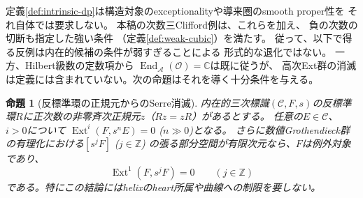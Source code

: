 \documentclass[11pt,a4paper]{ltjsarticle}
\newtheorem{proposition}[theorem]{命題}
\theoremstyle{definition}
\begin{document}
定義\ref{def:intrinsic-dp}は構造対象のexceptionalityや導来圏のsmooth proper性を
それ自体では要求しない。
本稿の次数三Clifford例は、これらを加え、
負の次数の切断も指定した強い条件
（定義\ref{def:weak-cubic}）を満たす。
従って、以下で得る反例は内在的候補の条件が弱すぎることによる
形式的な退化ではない。
一方、Hilbert級数の定数項から
$\operatorname{End}_{\mathcal A}(\mathcal O)=\mathbb C$は既に従うが、
高次Ext群の消滅は定義には含まれていない。次の命題はそれを導く十分条件を与える。

\begin{proposition}[反標準環の正規元からのSerre消滅]
\label{prop:intrinsic-central-serre-vanishing}
内在的三次標識$(\mathcal C,F,s)$の反標準環$R$に正次数の非零斉次正規元$z$（$Rz=zR$）があるとする。
任意の$E\in\mathcal C$、$i>0$について
$\operatorname{Ext}^i(F,s^n E)=0$ ($n\gg0$)となる。
さらに数値Grothendieck群の有理化における$[s^jF]$ ($j\in\mathbb Z$)
の張る部分空間が有限次元なら、$F$は例外対象であり、
\[
 \operatorname{Ext}^1(F,s^jF)=0\qquad(j\in\mathbb Z)
\]
である。特にこの結論にはhelixのheart所属や曲線への制限を要しない。
\end{proposition}
\end{document}
